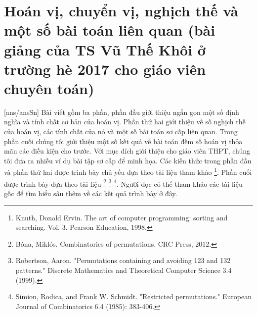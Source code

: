 \section{Hoán vị, chuyển vị, nghịch thế và một số bài toán liên quan (bài giảng của TS Vũ Thế Khôi ở trường hè 2017 cho giáo viên chuyên toán)}
[ans/ansSn]
Bài viết gồm ba phần, phần đầu giới thiệu ngắn gọn một số định nghĩa và tính chất cơ bản của 
hoán vị. Phần thứ hai giới thiệu về số nghịch thế của hoán vị, các tính chất của nó và một số 
bài toán sơ cấp liên quan. Trong phần cuối chúng tôi giới thiệu một số kết quả về bài toán đếm 
số hoán vị thỏa mãn các điều kiện cho trước. Với mục đích giới thiệu cho giáo viên THPT, chúng 
tôi đưa ra nhiều ví dụ bài tập sơ cấp để minh họa. Các kiến thức trong phần đầu và phần thứ hai 
được trình bày chủ yếu dựa theo tài liệu tham khảo \footnote{Knuth, Donald Ervin. The art of computer programming: sorting and searching. Vol. 3.
	Pearson Education, 1998.}. 
Phần cuối được trình bày dựa theo tài liệu \footnote{Bóna, Miklós. Combinatorics of permutations. CRC Press, 2012.}
\footnote{Robertson, Aaron. "Permutations containing and avoiding 123 and 132 patterns." Discrete
	Mathematics and Theoretical Computer Science 3.4 (1999).} \footnote{Simion, Rodica, and Frank W. Schmidt. "Restricted permutations." European Journal of
	Combinatorics 6.4 (1985): 383-406.}. Người đọc có thể tham khảo các tài liệu gốc để tìm hiểu sâu thêm về các kết quả 
trình bày ở đây.
